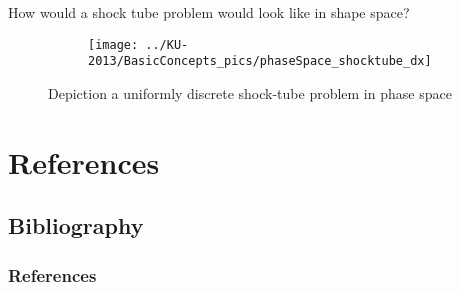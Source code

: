 \begin{frame}
How would a shock tube problem would look like in shape space?
 \begin{figure}
        \centering
        \begin{subfigure}[b]{0.60\textwidth}
                \centering
                \texttt{[image: ../KU-2013/BasicConcepts\_pics/phaseSpace\_shocktube\_dx]}
        \end{subfigure}%
        \caption{Depiction a uniformly discrete shock-tube problem in phase space}
        \label{fig:shocktube}
 \end{figure}
\end{frame}




\section{References}
\subsection{Bibliography}

\begin{frame}[allowframebreaks]
	\frametitle{References}
	
	
\end{frame}

